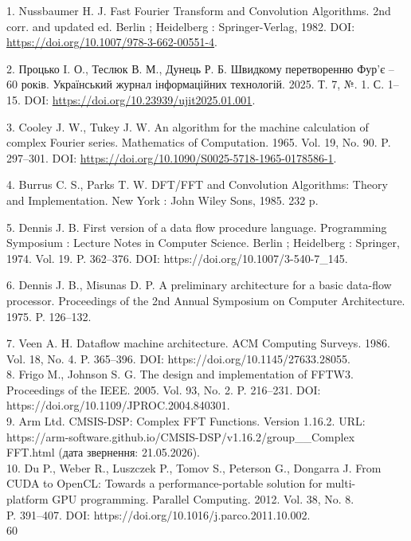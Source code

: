 \documentclass[
]{article}
\begin{document}
1. Nussbaumer H. J. Fast Fourier Transform and Convolution Algorithms.
2nd corr. and updated ed. Berlin ; Heidelberg : Springer-Verlag, 1982.
DOI: \url{https://doi.org/10.1007/978-3-662-00551-4}.

2. Процько I. О., Теслюк В. М., Дунець Р. Б. Швидкому перетворенню Фур'є
-- 60 рокiв. Український журнал інформаційних технологій. 2025. Т. 7, №.
1. С. 1--15. DOI: \url{https://doi.org/10.23939/ujit2025.01.001}.

3. Cooley J. W., Tukey J. W. An algorithm for the machine calculation of
complex Fourier series. Mathematics of Computation. 1965. Vol. 19, No.
90. P. 297--301. DOI:
\url{https://doi.org/10.1090/S0025-5718-1965-0178586-1}.

4. Burrus C. S., Parks T. W. DFT/FFT and Convolution Algorithms: Theory
and Implementation. New York : John Wiley Sons, 1985. 232 p.

5. Dennis J. B. First version of a data flow procedure language.
Programming Symposium : Lecture Notes in Computer Science. Berlin ;
Heidelberg : Springer, 1974. Vol. 19. P. 362--376. DOI:
https://doi.org/10.1007/3-540-7\_145.

6. Dennis J. B., Misunas D. P. A preliminary architecture for a basic
data-flow processor. Proceedings of the 2nd Annual Symposium on Computer
Architecture. 1975. P. 126--132.

7. Veen A. H. Dataflow machine architecture. ACM Computing Surveys.
1986.\\
Vol. 18, No. 4. P. 365--396. DOI: https://doi.org/10.1145/27633.28055.\\
8. Frigo M., Johnson S. G. The design and implementation of FFTW3.\\
Proceedings of the IEEE. 2005. Vol. 93, No. 2. P. 216--231. DOI:\\
https://doi.org/10.1109/JPROC.2004.840301.\\
9. Arm Ltd. CMSIS-DSP: Complex FFT Functions. Version 1.16.2. URL:\\
https://arm-software.github.io/CMSIS-DSP/v1.16.2/group\_\_Complex\\
FFT.html (дата звернення: 21.05.2026).\\
10. Du P., Weber R., Luszczek P., Tomov S., Peterson G., Dongarra J.
From\\
CUDA to OpenCL: Towards a performance-portable solution for multi-\\
platform GPU programming. Parallel Computing. 2012. Vol. 38, No. 8.\\
P. 391--407. DOI: https://doi.org/10.1016/j.parco.2011.10.002.\\
60
\end{document}
